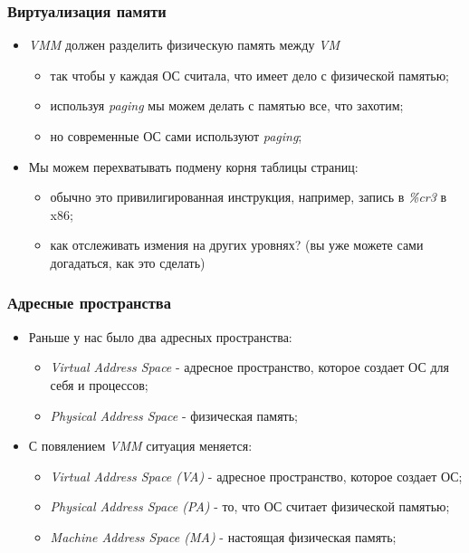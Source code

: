 \begin{frame}
\frametitle{Виртуализация памяти}
\begin{itemize}
  \item<1-> \emph{VMM} должен разделить физическую память между \emph{VM}
    \begin{itemize}
      \item так чтобы у каждая ОС считала, что имеет дело с физической памятью;
      \item используя \emph{paging} мы можем делать с памятью все, что захотим;
      \item но современные ОС сами используют \emph{paging};
    \end{itemize}
  \item<2-> Мы можем перехватывать подмену корня таблицы страниц:
    \begin{itemize}
      \item обычно это привилигированная инструкция, например, запись в
            \emph{\%cr3} в x86;
      \item как отслеживать измения на других уровнях? (вы уже можете сами
            догадаться, как это сделать)
    \end{itemize}
\end{itemize}
\end{frame}

\begin{frame}
\frametitle{Адресные пространства}
\begin{itemize}
  \item<1-> Раньше у нас было два адресных пространства:
    \begin{itemize}
      \item \emph{Virtual Address Space} - адресное пространство, которое
            создает ОС для себя и процессов;
      \item \emph{Physical Address Space} - физическая память;
    \end{itemize}
  \item<2-> С повялением \emph{VMM} ситуация меняется:
    \begin{itemize}
      \item \emph{Virtual Address Space (VA)} - адресное пространство, которое
            создает ОС;
      \item \emph{Physical Address Space (PA)} - то, что ОС считает физической
            памятью;
      \item \emph{Machine Address Space (MA)} - настоящая физическая память;
    \end{itemize}
\end{itemize}
\end{frame}

